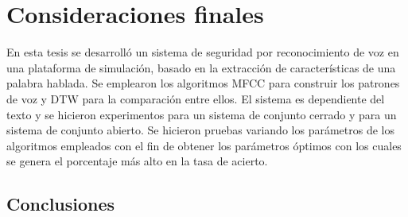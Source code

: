 \chapter{Consideraciones finales}
En esta tesis se desarrolló un sistema de seguridad por reconocimiento de voz en una plataforma de simulación, basado en la extracción de características de una palabra hablada. Se emplearon los algoritmos MFCC para construir los patrones de voz y DTW para la comparación entre ellos. El sistema es dependiente del texto y se hicieron experimentos para un sistema de conjunto cerrado y para un sistema de conjunto abierto. Se hicieron pruebas variando los parámetros de los algoritmos empleados con el fin de obtener los parámetros óptimos con los cuales se genera el porcentaje más alto en la tasa de acierto.

\section{Conclusiones}

